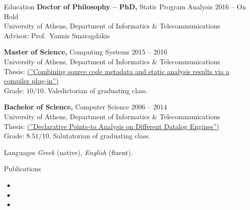 \documentclass{resume}
\begin{document}
\begin{rSection}{Education}
  {\bf Doctor of Philosophy -- PhD,} Static Program Analysis \hfill {2016 -- On Hold } \\
  University of Athens,  Department of Informatics \& Telecommunications \\
  Advisor: Prof.~Yannis Smaragdakis

  {\bf Master of Science,} Computing Systems \hfill {2015 -- 2016 } \\
  University of Athens,  Department of Informatics \& Telecommunications \\
  Thesis: \href{http://cgi.di.uoa.gr/~smaragd/theses/antoniadis2.pdf}{ (''Combining source code metadata and static analysis results via a compiler plug-in'')} \\
  Grade: $10 / 10$. Valedictorian of graduating class.

  {\bf Bachelor of Science,}  Computer Science \hfill {2006 -- 2014}  \\
  University of Athens,  Department of Informatics \& Telecommunications \\
  Thesis: \href{http://cgi.di.uoa.gr/~smaragd/theses/antoniadis.pdf}{ (''Declarative Points-to Analysis on Different Datalog Engines'')} \\
  Grade: $8.51 / 10$. Salutatorian of graduating class.
\end{rSection}

\begin{rSection}{Languages}
  \textit{Greek} (native), \textit{English} (fluent).\\
\end{rSection}

\begin{rSection}{Publications}
  \begin{rSubsection}{}{}{}{}
    \begin{itemize}[label={-}]
      \setlength\itemsep{-0.5em}
        \item {}
        \item {}
        \item {}
    \end{itemize}
  \end{rSubsection}
\end{rSection}
\end{document}
